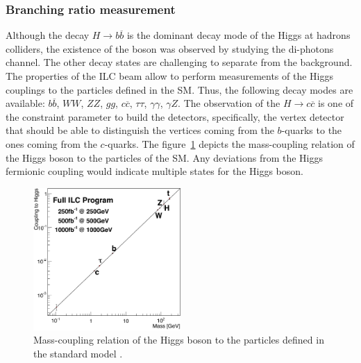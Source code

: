     \subsubsection{Branching ratio measurement}

    Although the decay $H \rightarrow b\overline{b}$ is the dominant decay mode of the Higgs at hadrons colliders, the existence of the boson was observed by studying the di-photons channel.
    The other decay states are challenging to separate from the background.
    The properties of the \gls{ILC} beam allow to perform measurements of the Higgs couplings to the particles defined in the \gls{SM}.
    Thus, the following decay modes are available: $b\overline{b}$, $WW$, $ZZ$, $gg$, $c\overline{c}$, $\tau \tau$, $\gamma \gamma$, $\gamma Z$.
    The observation of the $H \rightarrow c\overline{c}$ is one of the constraint parameter to build the detectors, specifically, the vertex detector that should be able to distinguish the vertices coming from the $b$-quarks to the ones coming from the $c$-quarks.
    The figure~\ref{fig:coupling} depicts the mass-coupling relation of the Higgs boson to the particles of the \gls{SM}.
    Any deviations from the Higgs fermionic coupling would indicate multiple states for the Higgs boson.

    \begin{figure}[!h]
      \centering
      \includegraphics[width = 0.5\textwidth]{Pictures/Higgs/Chapter_Theory_figs_mass-coupling1TeV.png}
      \caption{Mass-coupling relation of the Higgs boson to the particles defined in the standard model \cite{tian}.}
      \label{fig:coupling}
    \end{figure}


